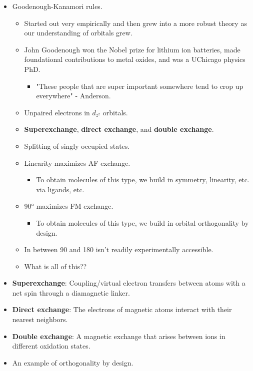 \documentclass[../notes.tex]{subfiles}
\begin{document}
\begin{itemize}
\begin{itemize}
    \end{itemize}
    \item Goodenough-Kanamori rules.
    \begin{itemize}
        \item Started out very empirically and then grew into a more robust theory as our understanding of orbitals grew. 
        \item John Goodenough won the Nobel prize for lithium ion batteries, made foundational contributions to metal oxides, and was a UChicago physics PhD.
        \begin{itemize}
            \item "These people that are super important somewhere tend to crop up everywhere" - Anderson.
        \end{itemize}
        \item Unpaired electrons in $d_{z^2}$ orbitals.
        \item \textbf{Superexchange}, \textbf{direct exchange}, and \textbf{double exchange}.
        \item Splitting of singly occupied states.
        \item Linearity maximizes AF exchange.
        \begin{itemize}
            \item To obtain molecules of this type, we build in symmetry, linearity, etc. via ligands, etc.
        \end{itemize}
        \item \ang{90} maximizes FM exchange.
        \begin{itemize}
            \item To obtain molecules of this type, we build in orbital orthogonality by design.
        \end{itemize}
        \item In between \num{90} and \num{180} isn't readily experimentally accessible.
        \item What is all of this??
    \end{itemize}
    \item \textbf{Superexchange}: Coupling/virtual electron transfers between atoms with a net spin through a diamagnetic linker.
    \item \textbf{Direct exchange}: The electrons of magnetic atoms interact with their nearest neighbors.
    \item \textbf{Double exchange}: A magnetic exchange that arises between ions in different oxidation states.
    \item An example of orthogonality by design.

\end{itemize}
\end{document}
